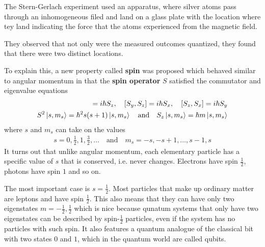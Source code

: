 The Stern-Gerlach experiment used an apparatus, where silver atoms pass through an inhomogeneous filed and land on a glass plate with the location where tey land indicating the force that the atoms experienced from the magnetic field.

They observed that not only were the measured outcomes quantized, they found that there were two distinct locations.

To explain this, a new property called \textbf{spin} was proposed which behaved similar to angular momentum in that the \textbf{spin operator} $S$ satisfied the commutator and eigenvalue equations
\begin{align*}
  [S_x,S_y] = i \hbar S_z, \quad
  [S_y,S_z] = i \hbar S_x, \quad
  [S_z,S_x] = i \hbar S_y\\
  S^{2} \ket{s,m_s} = \hbar^{2} s(s+1) \ket{s,m_s} \quad \text{and} \quad S_z \ket{s,m_s} = \hbar m \ket{s,m_s}
\end{align*}
where $s$ and $m_s$ can take on the values
\begin{align*}
  s = 0, \tfrac{1}{2}, 1, \frac{3}{2}, \ldots \quad \text{and} \quad m_s = -s, -s + 1, \ldots, s-1, s
\end{align*}
It turns out that unlike angular momentum, each elementary particle has a specific value of $s$ that is conserved, i.e. never changes. Electrons have spin $\tfrac{1}{2}$, photons have spin $1$ and so on.

The most important case is $s = \tfrac{1}{2}$. Most particles that make up ordinary matter are leptons and have spin $\tfrac{1}{2}$. 
This also means that they can have only two eigenstates $m = - \tfrac{1}{2}, \tfrac{1}{2}$ which is nice because qunatum systems that only have two eigenstates can be described by spin-$\tfrac{1}{2}$ particles, even if the system has no particles with such spin.
It also features a quantum analogue of the classical bit with two states $0$ and $1$, which in the quantum world are called qubits.

